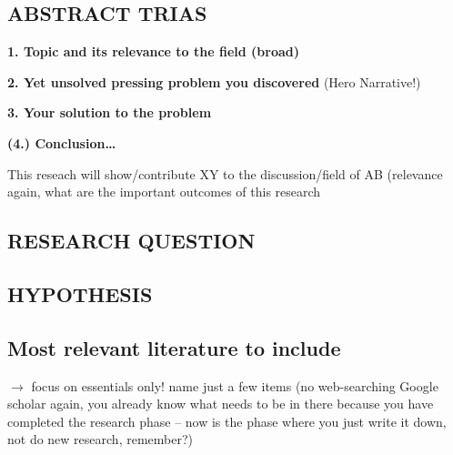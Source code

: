 \documentclass{article}
\begin{document}
\begin{minipage}[t]{0.45\textwidth}

\subsection*{\MakeUppercase{Abstract Trias}}
\textbf{1. Topic and its relevance to the field (broad)}
\vspace{3cm}

\textbf{2. Yet unsolved pressing problem you discovered} (Hero Narrative!)
\vspace{3cm}

\textbf{3. Your solution to the problem}
\vspace{3cm}

\textbf{(4.) Conclusion\dots }

{\scriptsize This reseach will show/contribute XY to the discussion/field of AB (relevance again, what are the important outcomes of this research

}
\vspace{2cm}

\end{minipage}\hfill
\begin{minipage}[t]{0.5\textwidth}

\begin{tcolorbox}\subsection*{\MakeUppercase{Research Question}}\color{white}\lipsum[75]\end{tcolorbox}
\begin{tcolorbox}\subsection*{\MakeUppercase{Hypothesis}}\color{white}\lipsum[75]\end{tcolorbox}
\subsection*{Most relevant literature to include}
\vspace{2cm}

{\scriptsize $\to$ focus on essentials only! name just a few items (no web-searching Google scholar again, you already know what needs to be in there because you have completed the research phase -- now is the phase where you just write it down, not do new research, remember?)

}

\end{minipage}\hfill
\end{document}
